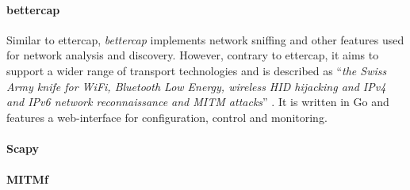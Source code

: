 \paragraph{bettercap} Similar to ettercap, \emph{bettercap} implements network sniffing and other features used for network analysis and discovery. However, contrary to ettercap, it aims to support a wider range of transport technologies and is described as \enquote{\emph{the Swiss Army knife for WiFi, Bluetooth Low Energy, wireless HID hijacking and IPv4 and IPv6 network reconnaissance and MITM attacks}} \cite{bettercap}. It is written in Go and features a web-interface for configuration, control and monitoring.
\paragraph{Scapy}
\paragraph{MITMf} %